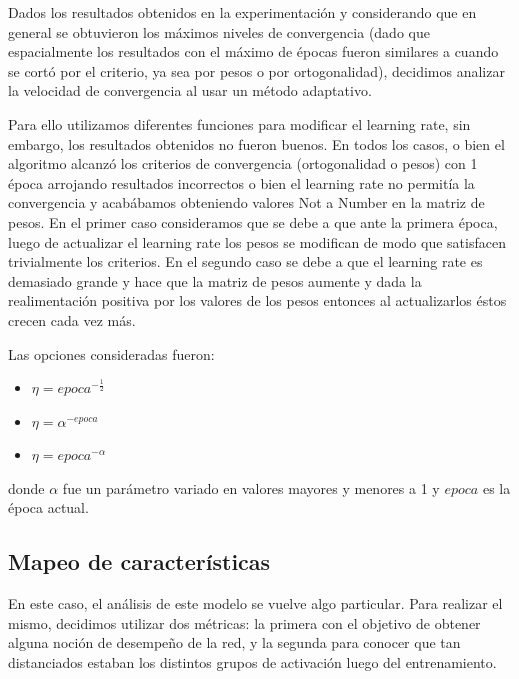 \documentclass[informe.tex]{subfiles}
\begin{document}
 
 
      Dados los resultados obtenidos en la experimentación y considerando que en general se obtuvieron los m\'aximos niveles de convergencia (dado que espacialmente los resultados con el m\'aximo de \'epocas fueron similares a cuando se cort\'o por el criterio, ya sea por pesos o por ortogonalidad), decidimos analizar la velocidad de convergencia al usar un m\'etodo adaptativo. 
 
      Para ello utilizamos diferentes funciones para modificar el learning rate, sin embargo, los resultados obtenidos no fueron buenos. En todos los casos, o bien el algoritmo alcanzó los criterios de convergencia (ortogonalidad o pesos) con 1 \'epoca arrojando resultados incorrectos o bien el learning rate no permit\'ia la convergencia y acab\'abamos obteniendo valores Not a Number en la matriz de pesos. En el primer caso consideramos que se debe a que ante la primera época, luego de actualizar el learning rate los pesos se modifican de modo que satisfacen trivialmente los criterios. En el segundo caso se debe a que el learning rate es demasiado grande y hace que la matriz de pesos aumente y dada la realimentación positiva por los valores de los pesos entonces al actualizarlos éstos crecen cada vez más.
      
      Las opciones consideradas fueron:
      
      \begin{itemize}
	\item $\eta = epoca ^ {-\frac{1}{2}}$
	\item $\eta = \alpha ^ {-epoca}$
	\item $\eta = epoca ^ {-\alpha}$
      \end{itemize}
      
      donde $\alpha$ fue un parámetro variado en valores mayores y menores a 1 y $epoca$ es la época actual.

 
      
    \subsection{Mapeo de características}
    
      En este caso, el análisis de este modelo se vuelve algo particular. Para realizar el mismo, decidimos utilizar dos métricas: la primera con el objetivo de obtener alguna noción de desempe\~no de la red, y la segunda para conocer que tan distanciados estaban los distintos grupos de activación luego del entrenamiento.
      
\end{document}
